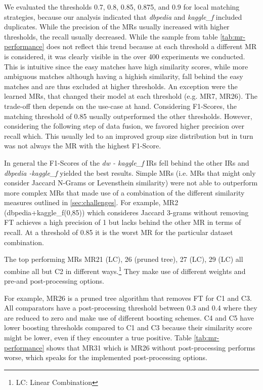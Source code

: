 \documentclass[11pt,titlepage,oneside,openany]{article}
\begin{document}
We evaluated the thresholds 0.7, 0.8, 0.85, 0.875, and 0.9 for local matching strategies, because our analysis indicated that \textit{dbpedia} and \textit{kaggle\_f} included duplicates. While the precision of the MRs usually increased with higher thresholds, the recall usually decreased. While the sample from table \ref{tab:mr-performance} does not reflect this trend because at each threshold a different MR is considered, it was clearly visible in the over 400 experiments we conducted.
This is intuitive since the easy matches have high similarity scores, while more ambiguous matches although having a highish similarity, fall behind the easy matches and are thus excluded at higher thresholds. An exception were the learned MRs, that changed their model at each threshold (e.g. MR7, MR26). The trade-off then depends on the use-case at hand. Considering F1-Scores, the matching threshold of 0.85 usually outperformed the other thresholds. However, considering the following step of data fusion, we favored higher precision over recall which. This usually led to an improved group size distribution but in turn was not always the MR with the highest F1-Score.

In general the F1-Scores of the \textit{dw - kaggle\_f} IRs fell behind the other IRs and \textit{dbpedia -kaggle\_f} yielded the best results. Simple MRs (i.e. MRs that might only consider Jaccard N-Grams or Levensthein similarity) were not able to outperform more complex MRs that made use of a combination of the different similarity measures outlined in \ref{sec:challenges}. For example, MR2 (dbpedia+kaggle\_f(0,85)) which consideres Jaccard 3-grams without removing FT achieves a high precision of 1 but lacks behind the other MR in terms of recall. At a threshold of 0.85 it is the worst MR for the particular dataset combination. 

The top performing MRs MR21 (LC), 26 (pruned tree), 27 (LC), 29 (LC) all combine all but C2 in different ways.\footnote{LC: Linear Combination} %
They make use of different weights and pre-and post-processing options.

For example, MR26  is a pruned tree algorithm that removes FT for C1 and C3. All comparators have a post-processing threshold between 0.3 and 0.4 where they are reduced to zero and make use of different boosting schemes. C4 and C5 have lower boosting thresholds compared to C1 and C3 because their similarity score might be lower, even if they encounter a true positive. Table \ref{tab:mr-performance} shows that MR31 which is MR26 without post-processing performs worse, which speaks for the implemented post-processing options.
\end{document}
